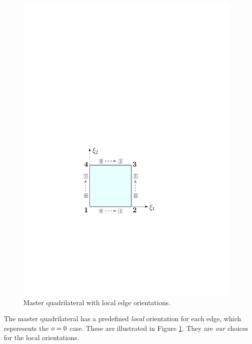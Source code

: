 \begin{figure}[!ht]
\begin{center}
\includegraphics[scale=0.5]{./figures/MasterQuadOrientations.pdf}
\caption{Master quadrilateral with local edge orientations.}
\label{fig:MasterQuadOrientations}
\end{center}
\end{figure}

The master quadrilateral has a predefined \textit{local} orientation for each edge, which reperesents the $o=0$ case. 
These are illustrated in Figure \ref{fig:MasterQuadOrientations}.
They are \textit{our} choices for the local orientations.


